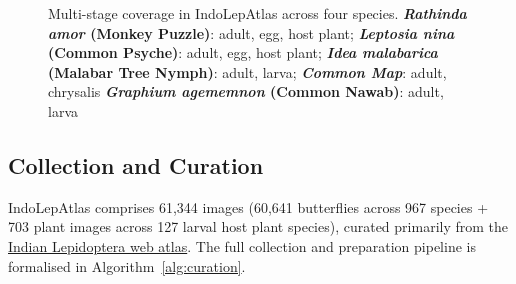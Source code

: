 \documentclass[runningheads]{llncs}
\begin{document}
\begin{figure}[H]

\caption{Multi-stage coverage in IndoLepAtlas across four species. \textbf{\textit{Rathinda amor} (Monkey Puzzle)}: adult, egg, host plant; \textbf{\textit{Leptosia nina} (Common Psyche)}: adult, egg, host plant; \textbf{\textit{Idea malabarica} (Malabar Tree Nymph)}: adult, larva;
\textbf{\textit{Common Map}}: adult, chrysalis  \textbf{\textit{Graphium agememnon} (Common Nawab)}: adult, larva \label{fig4}}
\end{figure}

\newpage
\subsection{Collection and Curation}
IndoLepAtlas comprises 61,344 images (60,641 butterflies across 967 species + 703 plant images across 127 larval host plant species), curated primarily from the \href{https://www.IFoundButterflies.org}{Indian Lepidoptera web atlas}. The full collection and preparation pipeline is formalised in Algorithm~\ref{alg:curation}.
\end{document}

